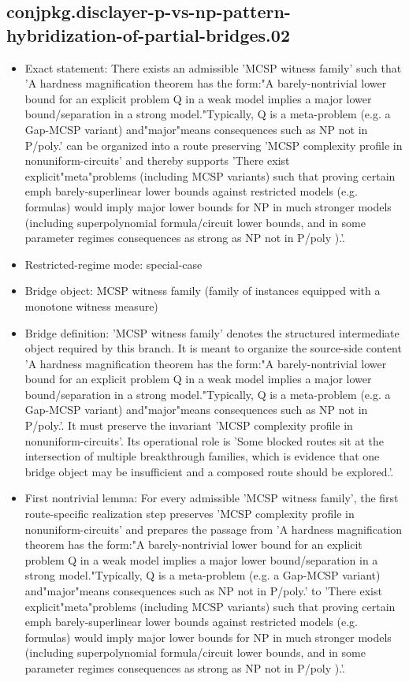 \documentclass[11pt]{article}
\begin{document}
\subsection*{conjpkg.disclayer-p-vs-np-pattern-hybridization-of-partial-bridges.02}
\begin{itemize}
\item Exact statement: There exists an admissible 'MCSP witness family' such that 'A hardness magnification theorem has the form:"A barely-nontrivial lower bound for an explicit problem Q in a weak model implies a major lower bound/separation in a strong model."Typically, Q is a meta-problem (e.g. a Gap-MCSP variant) and"major"means consequences such as NP not in P/poly.' can be organized into a route preserving 'MCSP complexity profile in nonuniform-circuits' and thereby supports 'There exist explicit"meta"problems (including MCSP variants) such that proving certain emph barely-superlinear lower bounds against restricted models (e.g. formulas) would imply major lower bounds for NP in much stronger models (including superpolynomial formula/circuit lower bounds, and in some parameter regimes consequences as strong as NP not in P/poly ).'.
\item Restricted-regime mode: special-case
\item Bridge object: MCSP witness family (family of instances equipped with a monotone witness measure)
\item Bridge definition: 'MCSP witness family' denotes the structured intermediate object required by this branch. It is meant to organize the source-side content 'A hardness magnification theorem has the form:"A barely-nontrivial lower bound for an explicit problem Q in a weak model implies a major lower bound/separation in a strong model."Typically, Q is a meta-problem (e.g. a Gap-MCSP variant) and"major"means consequences such as NP not in P/poly.'. It must preserve the invariant 'MCSP complexity profile in nonuniform-circuits'. Its operational role is 'Some blocked routes sit at the intersection of multiple breakthrough families, which is evidence that one bridge object may be insufficient and a composed route should be explored.'.
\item First nontrivial lemma: For every admissible 'MCSP witness family', the first route-specific realization step preserves 'MCSP complexity profile in nonuniform-circuits' and prepares the passage from 'A hardness magnification theorem has the form:"A barely-nontrivial lower bound for an explicit problem Q in a weak model implies a major lower bound/separation in a strong model."Typically, Q is a meta-problem (e.g. a Gap-MCSP variant) and"major"means consequences such as NP not in P/poly.' to 'There exist explicit"meta"problems (including MCSP variants) such that proving certain emph barely-superlinear lower bounds against restricted models (e.g. formulas) would imply major lower bounds for NP in much stronger models (including superpolynomial formula/circuit lower bounds, and in some parameter regimes consequences as strong as NP not in P/poly ).'.

\end{itemize}
\end{document}
